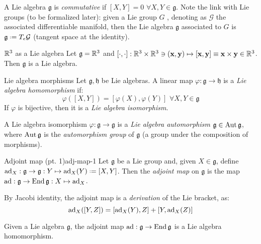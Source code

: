 A Lie algebra $ \mathfrak{g} $ is \textit{commutative} if $ [X,Y] = 0 \,\,\forall X,Y \in \mathfrak{g} $. Note the link with Lie groups (to be formalized later): given a Lie group $ G $ , denoting as $ \mathcal{G} $ the associated differentiable manifold, then the Lie algebra $ \mathfrak{g} $ associated to $ G $ is $ \mathfrak{g} \defeq T_e\mathcal{G} $ (tangent space at the identity).

\begin{example}{$ \mathbb{R}^3 $ as a Lie algebra}{}
  Let $ \mathfrak{g} = \mathbb{R}^3 $ and $ [\cdot,\cdot] : \mathbb{R}^3 \times \mathbb{R}^3 \ni (\mathbf{x},\mathbf{y}) \mapsto [\mathbf{x} , \mathbf{y}] \equiv \mathbf{x} \times \mathbf{y} \in \mathbb{R}^3 $. Then $ \mathfrak{g} $ is a Lie algebra.
\end{example}

\begin{definition}{Lie algebra morphisms}{}
  Let $ \mathfrak{g} , \mathfrak{h} $ be Lie algebras. A linear map $ \varphi : \mathfrak{g} \rightarrow \mathfrak{h} $ is a \textit{Lie algebra homomorphism} if:
  \begin{equation*}
    \varphi([X,Y]) = [\varphi(X),\varphi(Y)] \,\,\forall X,Y \in \mathfrak{g}
  \end{equation*}
  If $ \varphi $ is bijective, then it is a \textit{Lie algebra isomorphism}.
\end{definition}

A Lie algebra isomorphism $ \varphi : \mathfrak{g} \rightarrow \mathfrak{g} $ is a \textit{Lie algebra automorphism} $ \mathfrak{g} \in \operatorname{Aut}{\mathfrak{g}} $, where $ \operatorname{Aut}{\mathfrak{g}} $ is the \textit{automorphism group} of $ \mathfrak{g} $ (a group under the composition of morphisms).

\begin{definition}{Adjoint map (pt. 1)}{adj-map-1}
  Let $ \mathfrak{g} $ be a Lie group and, given $ X \in \mathfrak{g} $, define $ \ad_X : \mathfrak{g} \rightarrow \mathfrak{g} : Y \mapsto \ad_X(Y) \defeq [X,Y] $. Then the \textit{adjoint map} on $ \mathfrak{g} $ is the map $ \operatorname{ad} : \mathfrak{g} \rightarrow \operatorname{End}{\mathfrak{g}} : X \mapsto \operatorname{ad}_X $.
\end{definition}

By Jacobi identity, the adjoint map is a \textit{derivation} of the Lie bracket, as:
\begin{equation*}
  \operatorname{ad}_X([Y,Z]) = [\operatorname{ad}_X(Y),Z] + [Y,\operatorname{ad}_X(Z)]
\end{equation*}

\begin{proposition}{}{}
  Given a Lie algebra $ \mathfrak{g} $, the adjoint map $ \operatorname{ad} : \mathfrak{g} \rightarrow \operatorname{End}{\mathfrak{g}} $ is a Lie algebra homomorphism.
\end{proposition}

